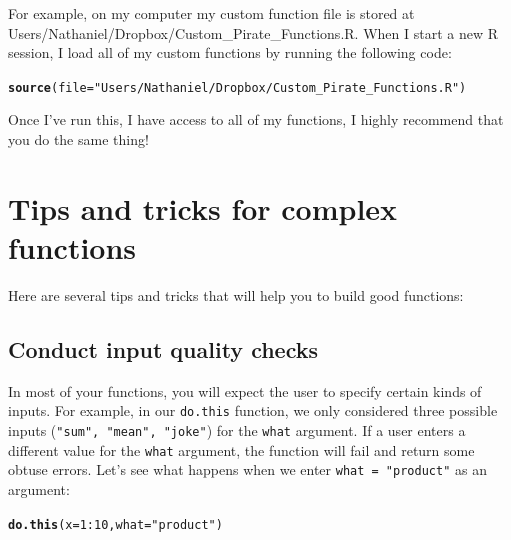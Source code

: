 \documentclass{tufte-book}\usepackage[]{graphicx}\usepackage[]{color}
\makeatletter
\newcommand{\hlnum}[1]{\textcolor[rgb]{0.686,0.059,0.569}{#1}}%
\newcommand{\hlstr}[1]{\textcolor[rgb]{0.192,0.494,0.8}{#1}}%
\newcommand{\hlopt}[1]{\textcolor[rgb]{0,0,0}{#1}}%
\newcommand{\hlstd}[1]{\textcolor[rgb]{0.345,0.345,0.345}{#1}}%
\newcommand{\hlkwc}[1]{\textcolor[rgb]{0.333,0.667,0.333}{#1}}%
\newcommand{\hlkwd}[1]{\textcolor[rgb]{0.737,0.353,0.396}{\textbf{#1}}}%
\newenvironment{kframe}{%
 \def\at@end@of@kframe{}%
 \ifinner\ifhmode%
  \def\at@end@of@kframe{\end{minipage}}%
  \begin{minipage}{\columnwidth}%
 \fi\fi%
 \def\FrameCommand##1{\hskip\@totalleftmargin \hskip-\fboxsep
 \colorbox{shadecolor}{##1}\hskip-\fboxsep
     \hskip-\linewidth \hskip-\@totalleftmargin \hskip\columnwidth}%
 \MakeFramed {\advance\hsize-\width
   \@totalleftmargin\z@ \linewidth\hsize
   \@setminipage}}%
 {\par\unskip\endMakeFramed%
 \at@end@of@kframe}
\newenvironment{knitrout}{}{} %
\makeatother
\begin{document}
\begin{footnotesize}
For example, on my computer my custom function file is stored at Users/Nathaniel/Dropbox/Custom\_Pirate\_Functions.R. When I start a new R session, I load all of my custom functions by running the following code:

\begin{knitrout}
\color{fgcolor}\begin{kframe}
\begin{alltt}
\hlkwd{source}\hlstd{(}\hlkwc{file} \hlstd{=} \hlstr{"Users/Nathaniel/Dropbox/Custom_Pirate_Functions.R"}\hlstd{)}
\end{alltt}
\end{kframe}
\end{knitrout}

Once I've run this, I have access to all of my functions, I highly recommend that you do the same thing!


\section{Tips and tricks for complex functions}

Here are several tips and tricks that will help you to build good functions:

\subsection{Conduct input quality checks}

In most of your functions, you will expect the user to specify certain kinds of inputs. For example, in our \texttt{do.this} function, we only considered three possible inputs (\texttt{"sum", "mean", "joke"}) for the \texttt{what} argument. If a user enters a different value for the \texttt{what} argument, the function will fail and return some obtuse errors. Let's see what happens when we enter \texttt{what = "product"} as an argument:

\begin{knitrout}
\color{fgcolor}\begin{kframe}
\begin{alltt}
\hlkwd{do.this}\hlstd{(}\hlkwc{x} \hlstd{=} \hlnum{1}\hlopt{:}\hlnum{10}\hlstd{,} \hlkwc{what} \hlstd{=} \hlstr{"product"}\hlstd{)}
\end{alltt}


{\ttfamily\noindent\bfseries{}}\end{kframe}
\end{knitrout}


\end{footnotesize}
\end{document}
